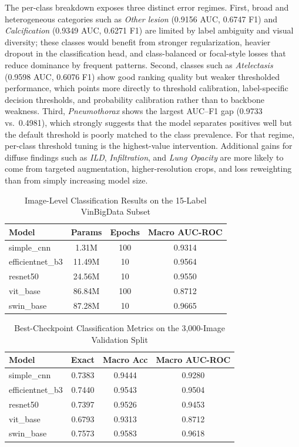 \documentclass[conference]{IEEEtran}
\begin{document}
The per-class breakdown exposes three distinct error regimes. First, broad and heterogeneous categories such as \textit{Other lesion} (0.9156 AUC, 0.6747 F1) and \textit{Calcification} (0.9349 AUC, 0.6271 F1) are limited by label ambiguity and visual diversity; these classes would benefit from stronger regularization, heavier dropout in the classification head, and class-balanced or focal-style losses that reduce dominance by frequent patterns. Second, classes such as \textit{Atelectasis} (0.9598 AUC, 0.6076 F1) show good ranking quality but weaker thresholded performance, which points more directly to threshold calibration, label-specific decision thresholds, and probability calibration rather than to backbone weakness. Third, \textit{Pneumothorax} shows the largest AUC--F1 gap (0.9733 vs.\ 0.4981), which strongly suggests that the model separates positives well but the default threshold is poorly matched to the class prevalence. For that regime, per-class threshold tuning is the highest-value intervention. Additional gains for diffuse findings such as \textit{ILD}, \textit{Infiltration}, and \textit{Lung Opacity} are more likely to come from targeted augmentation, higher-resolution crops, and loss reweighting than from simply increasing model size.

\begin{table}[t]
\caption{Image-Level Classification Results on the 15-Label VinBigData Subset}
\label{tab:classification}
\centering
\footnotesize
\begin{tabular}{lccc}
\toprule
Model & Params & Epochs & Macro AUC-ROC \\
\midrule
simple\_cnn & 1.31M & 100 & 0.9314 \\
efficientnet\_b3 & 11.49M & 10 & 0.9564 \\
resnet50 & 24.56M & 10 & 0.9550 \\
vit\_base & 86.84M & 100 & 0.8712 \\
swin\_base & 87.28M & 10 & 0.9665 \\
\bottomrule
\end{tabular}
\end{table}

\begin{table}[t]
\caption{Best-Checkpoint Classification Metrics on the 3,000-Image Validation Split}
\label{tab:classification_full}
\centering
\footnotesize
\begin{tabular}{lccc}
\toprule
Model & Exact & Macro Acc & Macro AUC-ROC \\
\midrule
simple\_cnn & 0.7383 & 0.9444 & 0.9280 \\
efficientnet\_b3 & 0.7440 & 0.9543 & 0.9504 \\
resnet50 & 0.7397 & 0.9526 & 0.9453 \\
vit\_base & 0.6793 & 0.9313 & 0.8712 \\
swin\_base & 0.7573 & 0.9583 & 0.9618 \\
\bottomrule
\end{tabular}
\end{table}
\end{document}
